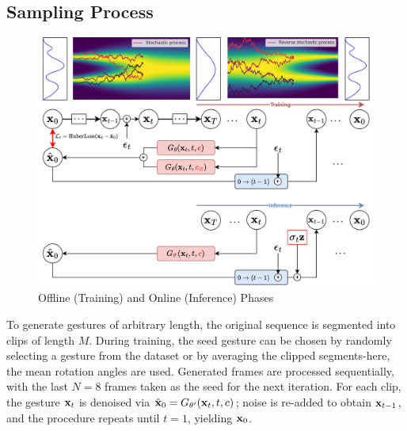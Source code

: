\subsection{Sampling Process}

\begin{figure}[h]
	\centering
	\includegraphics[width=\linewidth]{figures/OnlineAndOffline}
	\caption{Offline (Training) and Online (Inference) Phases}
	\label{fig:OnlineAndOffline}
\end{figure}

To generate gestures of arbitrary length, the original sequence is segmented into clips of length $M$.
During training, the seed gesture can be chosen by randomly selecting a gesture from the dataset or by averaging the clipped segments-here, the mean rotation angles are used.  
Generated frames are processed sequentially, with the last $N=8$ frames taken as the seed for the next iteration.  
For each clip, the gesture $\mathbf{x}_{t}$ is denoised via $\hat{\mathbf{x}}_{0} = G_{\theta'}(\mathbf{x}_{t}, t, c)$; noise is re-added to obtain $\mathbf{x}_{t-1}$, and the procedure repeats until $t=1$, yielding $\mathbf{x}_{0}$.

